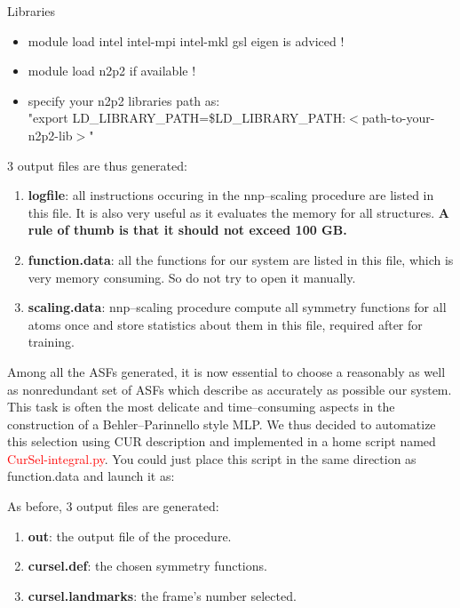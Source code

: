 \documentclass[12pt]{article}
\begin{document}
\begin{mybox4}{Libraries}
\begin{itemize}
    \item module load intel intel-mpi intel-mkl gsl eigen is adviced !
    \item module load n2p2 if available !
    \item specify your n2p2 libraries path as: \\ "export LD\_LIBRARY\_PATH=\$LD\_LIBRARY\_PATH:$<$path-to-your-n2p2-lib$>$"
\end{itemize}
\end{mybox4}
3 output files are thus generated:
\begin{enumerate}
    \item \textbf{logfile}: all instructions occuring in the nnp--scaling procedure are listed in this file. It is also very useful as it evaluates the memory for all structures. \textbf{A rule of thumb is that it should not exceed 100 GB.}
    \item \textbf{function.data}: all the functions for our system are listed in this file, which is very memory consuming. So do not try to open it manually.
    \item \textbf{scaling.data}: nnp--scaling procedure compute all symmetry functions for all atoms once and store statistics about them in this file, required after for training.
\end{enumerate}
Among all the ASFs generated, it is now essential to choose a reasonably as well as nonredundant set of ASFs which describe as accurately as possible our system. This task is often the most delicate and time--consuming aspects in the construction of a Behler--Parinnello style MLP. We thus decided to automatize this selection using CUR description and implemented in a home script named \textcolor{red}{CurSel-integral.py}. You could just place this script in the same direction as function.data and launch it as:
\begin{center}
\end{center}
As before, 3 output files are generated:
\begin{enumerate}
    \item \textbf{out}: the output file of the procedure.
    \item \textbf{cursel.def}: the chosen symmetry functions.
    \item \textbf{cursel.landmarks}: the frame's number selected.
\end{enumerate}
\end{document}
